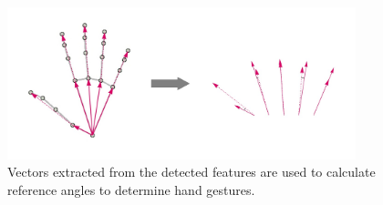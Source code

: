 \begin{figure}
  \centering
  \includegraphics[width=0.9\textwidth, keepaspectratio]{img/hand-vectors.jpg}
  \caption{Vectors extracted from the detected features are used to calculate reference angles to determine hand gestures.}
  \label{fig:vector-calcs}
\end{figure}

